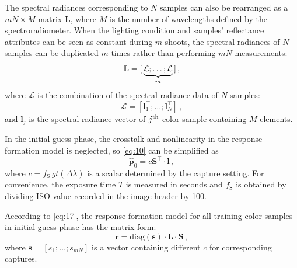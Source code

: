 \documentclass[9pt,twocolumn,twoside]{osajnl}
\begin{document}
The spectral radiances corresponding to $N$ samples can also be rearranged as a $mN\times{}M$ matrix $\mathbf{L}$, where $M$ is the number of wavelengths defined by the spectroradiometer. When the lighting condition and samples’ reflectance attributes can be seen as constant during $m$ shoots, the spectral radiances of $N$ samples can be duplicated $m$ times rather than performing $mN$ measurements:
\begin{equation}
\mathbf{L} = {\large[}\underbrace{\mathcal{L};\ldots;\mathcal{L}}_m{\large]}\,,
\label{eq:15}
\end{equation}
where $\mathcal{L}$ is the combination of the spectral radiance data of $N$ samples:
\begin{equation}
\mathcal{L} = \left[\mathbf{l}_1^\intercal;\ldots;\mathbf{l}_N^\intercal\right]\,,
\label{eq:16}
\end{equation}
and $\mathbf{l}_j$ is the spectral radiance vector of $j\textsuperscript{th}$ color sample containing $M$ elements.

In the initial guess phase, the crosstalk and nonlinearity in the response formation model is neglected, so \eqref{eq:10} can be simplified as
\begin{equation}
\mathbf{\hat{p}}_0 = c\mathbf{S}^\intercal\cdot\mathbf{l}\,,
\label{eq:17}
\end{equation}
where $c = f_\text{S}\,gt(\Delta\lambda)$ is a scalar determined by the capture setting. For convenience, the exposure time $T$ is measured in seconds and $f_\text{S}$ is obtained by dividing ISO value recorded in the image header by 100.

According to \eqref{eq:17}, the response formation model for all training color samples in initial guess phase has the matrix form:
\begin{equation}
\mathbf{r} = \text{diag}(\mathbf{s})\cdot\mathbf{L}\cdot\mathbf{S}\,,
\label{eq:18}
\end{equation}
where $\mathbf{s} = \left[s_1;\ldots;s_{mN}\right]$ is a vector containing different $c$ for corresponding captures.
\end{document}
